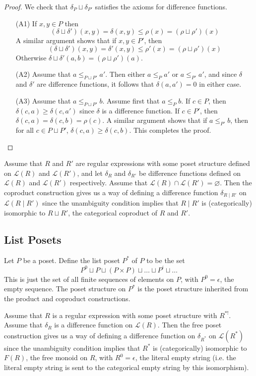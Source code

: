\documentclass[acmsmall,review,anonymous]{acmart}\settopmatter{printfolios=true,printccs=false,printacmref=false}
\begin{document}
\begin{proof}
We check that $\delta_P \sqcup \delta_{P'}$ satisfies the axioms for difference
functions.
\begin{enumerate}
  \item[(A1)]
  If $x, y \in P$ then
  $$
  (\delta \sqcup \delta')(x, y) = \delta(x, y) \leq \rho(x) = (\rho \sqcup
  \rho')(x)
  $$
  A similar argument shows that if $x, y \in P'$, then
  $$
  (\delta \sqcup \delta')(x, y) = \delta'(x, y) \leq \rho'(x) = (\rho \sqcup
  \rho')(x)
  $$
  Otherwise $\delta \sqcup \delta'(a, b) = (\rho \sqcup \rho')(a)$.
  \item[(A2)]
  Assume that $a \leq_{P \sqcup P'} a'$. Then either $a \leq_P a'$ or $a
  \leq_{P'} a'$, and since $\delta$ and $\delta'$ are difference functions, it
  follows that $\delta(a, a') = 0$ in either case.
  \item[(A3)]
  Assume that $a \leq_{P \sqcup P'} b$. Assume first that $a \leq_P b$. If $c
  \in P$, then $\delta(c, a) \geq \delta(c, a')$ since $\delta$ is a difference
  function. If $c \in P'$, then $\delta(c, a) = \delta(c, b) = \rho(c)$. A
  similar argument shows that if $a \leq_{P'} b$, then for all $c \in P \sqcup
  P'$, $\delta(c, a) \geq \delta(c, b)$. This completes the proof.
\end{enumerate}
\end{proof}
Assume that $R$ and $R'$ are regular expressions with some poset structure
defined on $\mathcal{L}(R)$ and $\mathcal{L}(R')$, and let $\delta_R$ and
$\delta_{R'}$ be difference functions defined on $\mathcal{L}(R)$ and
$\mathcal{L}(R')$ respectively. Assume that $\mathcal{L}(R) \cap
\mathcal{L}(R') = \varnothing$. Then the coproduct construction gives us a way
of defining a difference function $\delta_{R \; | \; R'}$ on $\mathcal{L}(R \;
| \; R')$ since the unambiguity condition implies that $R \; | \; R'$ is
(categorically) isomorphic to $R \sqcup R'$, the categorical coproduct of $R$
and $R'$.
\subsection{List Posets}
Let $P$ be a poset. Define the list poset $P^*$ of $P$ to be the set
$$P^0 \sqcup P \sqcup (P \times P) \sqcup \ldots \sqcup P^i \sqcup \ldots$$
This is just the set of all finite sequences of elements on $P$, with $P^0 =
\epsilon$, the empty sequence. The poset structure on $P^*$ is the poset
structure inherited from the product and coproduct constructions.

Assume that $R$ is a regular expression with some poset structure with $R^{*!}$.
Assume that $\delta_R$ is a difference function on $\mathcal{L}(R)$. Then
the free poset construction gives us a way of defining a difference function
on $\delta_{R^*}$ on $\mathcal{L}(R^*)$ since the unambiguity condition implies
that $R^*$ is (categorically) isomorphic to $F(R)$, the free monoid on $R$,
with $R^0 = \epsilon$, the literal empty string (i.e. the literal empty string
is sent to the categorical empty string by this isomorphism).
\end{document}
